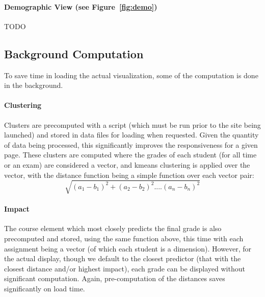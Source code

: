 \paragraph{Demographic View (see Figure~\ref{fig:demo})}
TODO

\subsection{Background Computation}
To save time in loading the actual visualization, some of the computation is done in the background. 

\paragraph{Clustering}
Clusters are precomputed with a script (which must be run prior to the site being launched) and stored in data files for loading 
when requested. Given the quantity of data being processed, this significantly improves the responsiveness for a given page. 
These clusters are computed where the grades of each student (for all time or an exam) are considered a vector, and kmeans 
clustering is applied over the vector, with the distance function being a simple function over each vector pair:
\[  \sqrt{ (a_1-b_1)^2 + (a_2-b_2)^2 .... (a_n-b_n)^2   }\]

\paragraph{Impact}
The course element which most closely predicts the final grade is also precomputed and stored, using the same function above, this time with each assignment being a vector (of which each student is a dimension). However, for the actual display, though we default to the closest predictor (that with the closest distance and/or highest impact), each grade can be displayed without significant computation. Again, pre-computation of the distances saves significantly on load time. 
